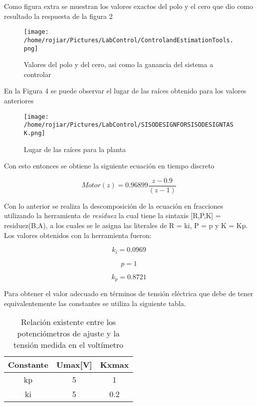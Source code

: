\documentclass[a4paper,10pt,twocolumn]{article}
\begin{document}
Como figura extra se muestran los valores exactos del polo y el cero que dio como resultado la respuesta de la figura 2

\begin{figure}[h!]
\centering
\texttt{[image: /home/rojiar/Pictures/LabControl/ControlandEstimationTools.png]}
\caption{Valores del polo y del cero, asi como la ganancia del sistema a controlar}
\label{Valores del polo y del cero, asi como la ganancia del sistema a controlar}
\end{figure}

En la Figura 4 se puede observar el lugar de las raíces obtenido para los valores anteriores

\begin{figure}[h!]
\centering
\texttt{[image: /home/rojiar/Pictures/LabControl/SISODESIGNFORSISODESIGNTASK.png]}
\caption{Lugar de las raíces para la planta}
\label{Lugar de las raices para la planta}
\end{figure}

Con esto entonces se obtiene la siguiente ecuación en tiempo discreto

\begin{center}
$$
 Motor(z) = 0.96899 \frac{z-0.9}{(z-1)}
$$
\end{center}

\newpage

Con lo anterior se realiza la descomposición de la ecuación en fracciones utilizando la herramienta de \textit{residuez} la cual tiene
la sintaxis [R,P,K] = residuez(B,A), a los cuales se le asigna las literales de R = ki, P = p y K = Kp. Los valores obtenidos con la
herramienta fueron:

\begin{center}
$$
  k_{i} = 0.0969
$$
\end{center}

\begin{center}
$$
  p = 1
$$
\end{center}

\begin{center}
$$
  k_{p} = 0.8721
$$
\end{center}

Para obtener el valor adecuado en términos de tensión eléctrica que debe de tener equivalentemente las constantes se utiliza la siguiente tabla.

\begin{table}[h]
\caption{Relación existente entre los potenciómetros de ajuste y la tensión medida en el voltímetro}
\centering
\begin{tabular}{c | c | c}
\hline
  Constante & Umax[V] & Kxmax \\
  \hline
  kp & 5 & 1 \\
  \hline
  ki & 5 & 0.2 \\
  \hline
\end{tabular}
\label{Relacion existente entre los potenciometros de ajuste y la tension medida en el multimetro}
\end{table}
\end{document}
